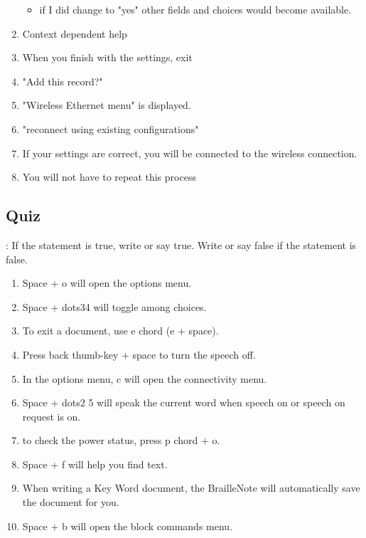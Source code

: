 \documentclass[10pt,letterpaper,twoside]{report}
\begin{document}
\begin{enumerate}
	      \begin{itemize}\item if I did change to "yes" other fields and choices would become available.
	      \end{itemize}
	\item Context dependent help 
	\item When you finish with the settings, exit 
	\item "Add this record?" 
	\item "Wireless Ethernet menu" is displayed.
	\item "reconnect using existing configurations" 
	\item If your settings are correct, you will be connected to the wireless connection.
	\item You will not have to repeat this process
\end{enumerate}
\clearpage 
\subsection{Quiz}:
If the statement is true, write or say true. Write or say false if the statement is false.
\begin{enumerate}
	\item Space + o will open the options menu.
	\item Space + dots34  will toggle among choices.
	\item To exit a document, use e chord (e + space).
	\item Press back thumb-key + space to turn the speech off.
	\item In the options menu, c will open the connectivity menu.
	\item Space + dots2 5 will speak the current word when speech on or speech on request is on.
	\item to check the power status, press p chord + o.
	\item Space + f will help you find text.
	\item When writing a Key Word document, the BrailleNote will automatically save the document for you.
	\item Space + b will open the block commands menu.
\end{enumerate}
\clearpage
\end{document}
